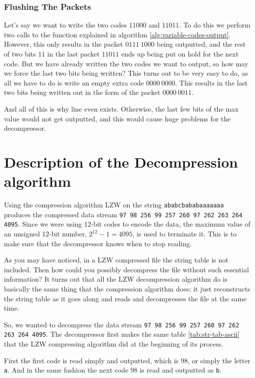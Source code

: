 \subsubsection{Flushing The Packets}

Let's say we want to write the two codes $11000$ and $11011$. To do
this we perform two calls to the function explained in algorithm
\ref{alg:variable-codes-output}. However, this only results in the
packet $0111 \ 1000$ being outputted, and the rest of two bits $11$ in
the last packet $11011$ ends up being put on hold for the next
code. But we have already written the two codes we want to output, so
how may we force the last two bits being written?  This turns out to
be very easy to do, as all we have to do is write an empty extra code
$0000 \ 0000$. This results in the last two bits being written out in
the form of the packet $0000 \ 0011$.

And all of this is why line 
even exists. Otherwise, the last few bits of the max value would not
get outputted, and this would cause huge problems for the
decompressor.

\section{Description of the Decompression algorithm}

Using the compression algorithm LZW on the string
\texttt{ababcbababaaaaaaa} produces the compressed data stream
\texttt{97 98 256 99 257 260 97 262 263 264 4095}. Since we were using
12-bit codes to encode the data, the maximum value of an unsigned
12-bit number, $2^{12} - 1 = 4095$, is used to terminate it. This is to
make sure that the decompressor knows when to stop reading.

As you may have noticed, in a LZW compressed file the string table is
not included. Then how could you possibly decompress the file without
such essential information? It turns out that all the LZW
decompression algorithm do is basically the same thing that the
compression algorithm does; it just reconstructs the string table as
it goes along and reads and decompresses the file at the same time.

So, we wanted to decompress the data stream \texttt{97 98 256 99 257
  260 97 262 263 264 4095}. The decompressor first makes the same
table \ref{tab:str-tab-ascii}  that the LZW compressing algorithm did at the beginning of
its process.

First the first code is read simply and outputted, which is $98$, or
simply the letter \texttt{a}. And in the same fashion the next code
$98$ is read and outputted as \texttt{b}.

